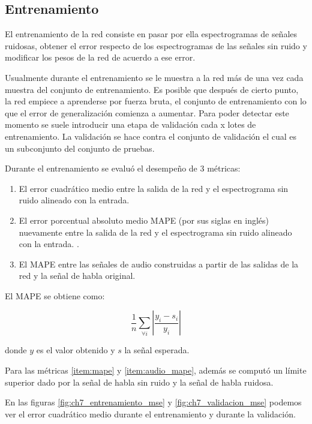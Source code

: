 \subsection{Entrenamiento}

El entrenamiento de la red consiste en pasar por ella espectrogramas de señales ruidosas, obtener el error respecto de los espectrogramas de las señales sin ruido y modificar los pesos de la red de acuerdo a ese error.

Usualmente durante el entrenamiento se le muestra a la red más de una vez cada muestra del conjunto de entrenamiento. Es posible que después de cierto punto, la red empiece a aprenderse por fuerza bruta, el conjunto de entrenamiento con lo que el error de generalización comienza a aumentar. Para poder detectar este momento se suele introducir una etapa de validación cada x lotes de entrenamiento. La validación se hace contra el conjunto de validación el cual es un subconjunto del conjunto de pruebas.

Durante el entrenamiento se evaluó el desempeño de 3 métricas:

\begin{enumerate}
	\item El error cuadrático medio entre la salida de la red y el espectrograma sin ruido alineado con la entrada.
	\item El error porcentual absoluto medio MAPE (por sus siglas en inglés) nuevamente entre la salida de la red y el espectrograma sin ruido alineado con la entrada. \label{item:mape}.
	\item El MAPE entre las señales de audio construidas a partir de las salidas de la red y la señal de habla original. \label{item:audio_mape}
\end{enumerate}

El MAPE se obtiene como:

\begin{equation*}
	\frac{1}{n} \sum_{\forall i} \left| \frac{y_i - s_i}{y_i} \right|
\end{equation*}

donde $y$ es el valor obtenido y $s$ la señal esperada.

Para las métricas \ref{item:mape} y \ref{item:audio_mape}, además se computó un límite superior dado por la señal de habla sin ruido y la señal de habla ruidosa.

En las figuras \ref{fig:ch7_entrenamiento_mse} y \ref{fig:ch7_validacion_mse} podemos ver el error cuadrático medio durante el entrenamiento y durante la validación.

